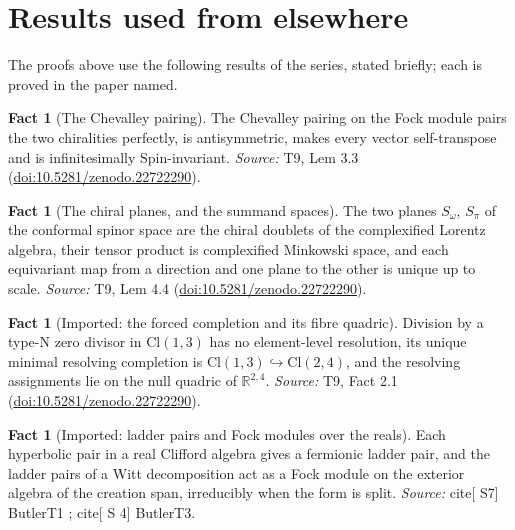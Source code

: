 \documentclass[11pt]{article}
\theoremstyle{definition}
\newtheorem{fact}[theorem]{Fact}
\theoremstyle{plain}
\providecommand{\Cl}{}\renewcommand{\Cl}{\mathrm{Cl}}
\providecommand{\R}{}\renewcommand{\R}{\mathbb{R}}
\providecommand{\Som}{}\renewcommand{\Som}{S_\omega}
\providecommand{\Spi}{}\renewcommand{\Spi}{S_\pi}
\providecommand{\Spin}{}\renewcommand{\Spin}{\mathrm{Spin}}
\begin{document}
\section{Results used from elsewhere}
The proofs above use the following results of the series, stated briefly; each is proved in the paper named.

\begin{fact}[The Chevalley pairing]\label{c:correspondence.chevalley-pairing}
The Chevalley pairing on the Fock module pairs the two chiralities perfectly, is antisymmetric, makes every vector self-transpose and is infinitesimally $\Spin$-invariant.
\emph{Source:} T9, Lem 3.3 (\href{https://doi.org/10.5281/zenodo.22722290}{doi:10.5281/zenodo.22722290}).
\end{fact}

\begin{fact}[The chiral planes, and the summand spaces]\label{c:correspondence.chiral-planes-summand-spaces}
The two planes $\Som$, $\Spi$ of the conformal spinor space are the chiral doublets of the complexified Lorentz algebra, their tensor product is complexified Minkowski space, and each equivariant map from a direction and one plane to the other is unique up to scale.
\emph{Source:} T9, Lem 4.4 (\href{https://doi.org/10.5281/zenodo.22722290}{doi:10.5281/zenodo.22722290}).
\end{fact}

\begin{fact}[Imported: the forced completion and its fibre quadric]\label{c:correspondence.imported-forced-completion-fibre-quadric}
Division by a type-N zero divisor in $\Cl(1,3)$ has no element-level resolution, its unique minimal resolving completion is $\Cl(1,3) \hookrightarrow \Cl(2,4)$, and the resolving assignments lie on the null quadric of $\R^{2,4}$.
\emph{Source:} T9, Fact 2.1 (\href{https://doi.org/10.5281/zenodo.22722290}{doi:10.5281/zenodo.22722290}).
\end{fact}

\begin{fact}[Imported: ladder pairs and Fock modules over the reals]\label{c:correspondence.imported-ladder-pairs-fock-modules-over}
Each hyperbolic pair in a real Clifford algebra gives a fermionic ladder pair, and the ladder pairs of a Witt decomposition act as a Fock module on the exterior algebra of the creation span, irreducibly when the form is split.
\emph{Source:} cite[ S7] ButlerT1 ;  cite[ S 4] ButlerT3.
\end{fact}
\end{document}
